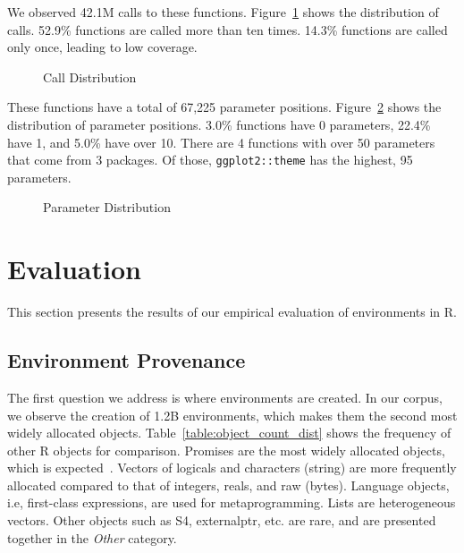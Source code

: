 \documentclass[10pt,review,sigplan,anonymous=true,authorversion=true,nonacm=true]{acmart}
\begin{document}
We observed 42.1M calls to these functions. Figure~\ref{fig:calldist} shows the
distribution of calls. 52.9\% functions are called more than ten times. 14.3\%
functions are called only once, leading to low coverage.

\begin{figure}[!h]
  \centering
  
  \caption{Call Distribution}
  \label{fig:calldist}
\end{figure}

These functions have a total of 67,225 parameter positions.
Figure~\ref{fig:paramdist} shows the distribution of parameter positions.
3.0\% functions have 0 parameters, 22.4\% have 1, and 5.0\% have over
10. There are 4 functions with over 50 parameters that come from 3 packages. Of
those, \texttt{ggplot2::theme} has the highest, 95 parameters.

\begin{figure}[!h]
  \centering
  
  \caption{Parameter Distribution}
  \label{fig:paramdist}
\end{figure}

\section{Evaluation}

This section presents the results of our empirical evaluation of environments in
R.

\subsection{Environment Provenance}
The first question we address is where environments are created. In our corpus,
we observe the creation of 1.2B environments, which makes them the second most
widely allocated objects. Table~\ref{table:object_count_dist} shows the
frequency of other R objects for comparison. Promises are the most widely
allocated objects, which is expected~\cite{oopsla19b}. Vectors of logicals and
characters (string) are more frequently allocated compared to that of integers,
reals, and raw (bytes). Language objects, i.e, first-class expressions, are used
for metaprogramming. Lists are heterogeneous vectors. Other objects such as S4,
externalptr, etc. are rare, and are presented together in the \emph{Other}
category.
\end{document}
